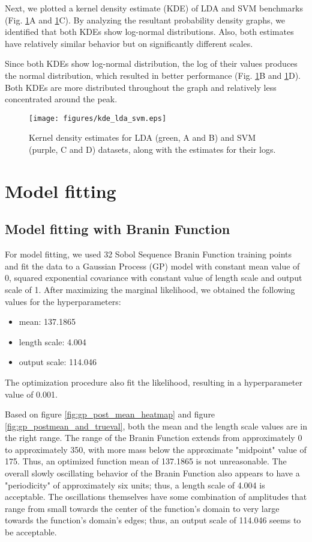 \documentclass[11pt]{article}
\numberwithin{equation}{section}
\begin{document}
Next, we plotted a kernel density estimate (KDE) of LDA and SVM benchmarks (Fig.  \ref{fig:kde-lda-svm}A and \ref{fig:kde-lda-svm}C). By analyzing the resultant probability density graphs, we identified that both KDEs show log-normal distributions. Also, both estimates have relatively similar behavior but on significantly different scales.

Since both KDEs show log-normal distribution, the log of their values produces the normal distribution, which resulted in better performance (Fig. \ref{fig:kde-lda-svm}B and \ref{fig:kde-lda-svm}D). Both KDEs are more distributed throughout the graph and relatively less concentrated around the peak.

\begin{figure}[H]
  \centering
  \texttt{[image: figures/kde\_lda\_svm.eps]}
  \caption{Kernel density estimates for LDA (green, A and B) and SVM (purple, C and D) datasets, along with the estimates for their logs.}
  \label{fig:kde-lda-svm}
\end{figure}

\section{Model fitting}
\subsection*{Model fitting with Branin Function}
For model fitting, we used 32 Sobol Sequence Branin Function training points and fit the data to a Gaussian Process (GP) model with constant mean value of 0, squared exponential covariance with constant value of length scale and output scale of 1. After maximizing the marginal likelihood, we obtained the following values for the hyperparameters:
\begin{itemize}
  \item
    mean: 137.1865
  \item
    length scale: 4.004
  \item
    output scale: 114.046
\end{itemize}
The optimization procedure also fit the likelihood, resulting in a hyperparameter value of 0.001.

Based on figure \ref{fig:gp_post_mean_heatmap} and figure \ref{fig:gp_postmean_and_trueval}, both the mean and the length scale values are in the right range. The range of the Branin Function extends from approximately 0 to approximately 350, with more mass below the approximate "midpoint" value of 175. Thus, an optimized function mean of 137.1865 is not unreasonable. The overall slowly oscillating behavior of the Branin Function also appears to have a "periodicity" of approximately six units; thus, a length scale of 4.004 is acceptable. The oscillations themselves have some combination of amplitudes that range from small towards the center of the function's domain to very large towards the function's domain's edges; thus, an output scale of 114.046 seems to be acceptable. 
\end{document}
